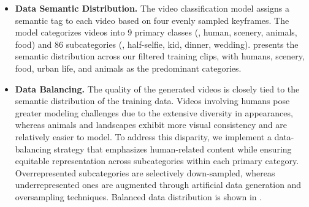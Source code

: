 \begin{itemize}[align=parleft, left=0pt, labelsep=0.5em]
    \item \textbf{Data Semantic Distribution.} The video classification model assigns a semantic tag to each video based on four evenly sampled keyframes. The model categorizes videos into 9 primary classes (\eg, human, scenery, animals, food) and 86 subcategories (\eg, half-selfie, kid, dinner, wedding).  presents the semantic distribution across our filtered training clips, with humans, scenery, food, urban life, and animals as the predominant categories.
    \item \textbf{Data Balancing.} The quality of the generated videos is closely tied to the semantic distribution of the training data. Videos involving humans pose greater modeling challenges due to the extensive diversity in appearances, whereas animals and landscapes exhibit more visual consistency and are relatively easier to model. To address this disparity, we implement a data-balancing strategy that emphasizes human-related content while ensuring equitable representation across subcategories within each primary category. Overrepresented subcategories are selectively down-sampled, whereas underrepresented ones are augmented through artificial data generation and oversampling techniques. Balanced data distribution is shown in .
\end{itemize}
